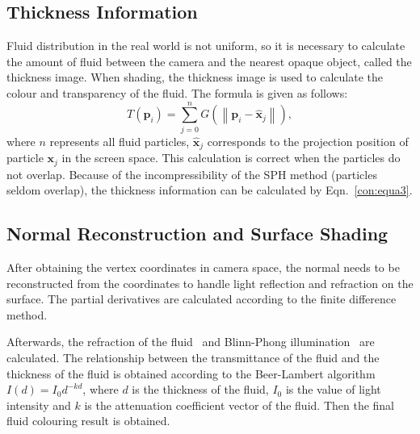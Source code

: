\documentclass[times,twocolumn,final]{elsarticle}
\begin{document}
\subsection{Thickness Information}
Fluid distribution in the real world is not uniform, so it is necessary to calculate the amount of fluid between the camera and the nearest opaque object, called the thickness image. When shading, the thickness image is used to calculate the colour and transparency of the fluid\cite{ref:ref14}. The formula is given as follows:
\begin{equation}
    T(\mathbf{{p}}_i)=\sum_{j=0}^{n} G\left( \left\| \mathbf{{p}}_i - \mathbf{\hat{x}}_j \right\| \right), 
\label{con:equa3}
\end{equation}
where $n$ represents all fluid particles, $\mathbf{\hat{x}}_j$ corresponds to the projection position of particle $\mathbf{{x}}_j$ in the screen space. This calculation is correct when the particles do not overlap. Because of the incompressibility of the SPH method (particles seldom overlap), the thickness information can be calculated by Eqn.~\ref{con:equa3}.

\subsection{Normal Reconstruction and Surface Shading}
After obtaining the vertex coordinates in camera space, the normal needs to be reconstructed from the coordinates to handle light reflection and refraction on the surface. The partial derivatives are calculated according to the finite difference method.

Afterwards, the refraction of the fluid~\cite{ref:ref25} and Blinn-Phong illumination~\cite{ref:ref27} are calculated. The relationship between the transmittance of the fluid and the thickness of the fluid is obtained according to the Beer-Lambert algorithm\cite{ref:ref28} $I(d)=I_{0} d^{-k d}$, where $d$ is the thickness of the fluid, $I_0$ is the value of light intensity and $k$ is the attenuation coefficient vector of the fluid. Then the final fluid colouring result is obtained.
\end{document}
